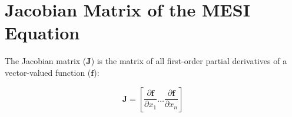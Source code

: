 
\chapter{Jacobian Matrix of the MESI Equation} \label{app:mesi_jacobian}

The Jacobian matrix ($\bm{J}$) is the matrix of all first-order partial derivatives of a vector-valued function ($\bm{f}$):

\begin{equation}
    \bm{J} = \left[\frac{\partial \bm{f}}{\partial x_1} \ldots \frac{\partial \bm{f}}{\partial x_n}\right]
\end{equation}
